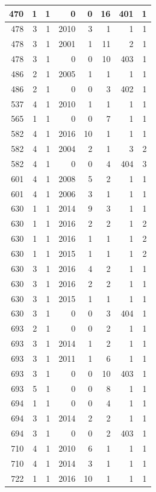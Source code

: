 \documentclass[11pt,]{book}
\begin{document}
\begin{table}
\begin{tabular}[t]{r|r|r|r|r|r|r|r}
470 & 1 & 1 & 0 & 0 & 16 & 401 & 1\\
\hline
478 & 3 & 1 & 2010 & 3 & 1 & 1 & 1\\
\hline
478 & 3 & 1 & 2001 & 1 & 11 & 2 & 1\\
\hline
478 & 3 & 1 & 0 & 0 & 10 & 403 & 1\\
\hline
486 & 2 & 1 & 2005 & 1 & 1 & 1 & 1\\
\hline
486 & 2 & 1 & 0 & 0 & 3 & 402 & 1\\
\hline
537 & 4 & 1 & 2010 & 1 & 1 & 1 & 1\\
\hline
565 & 1 & 1 & 0 & 0 & 7 & 1 & 1\\
\hline
582 & 4 & 1 & 2016 & 10 & 1 & 1 & 1\\
\hline
582 & 4 & 1 & 2004 & 2 & 1 & 3 & 2\\
\hline
582 & 4 & 1 & 0 & 0 & 4 & 404 & 3\\
\hline
601 & 4 & 1 & 2008 & 5 & 2 & 1 & 1\\
\hline
601 & 4 & 1 & 2006 & 3 & 1 & 1 & 1\\
\hline
630 & 1 & 1 & 2014 & 9 & 3 & 1 & 1\\
\hline
630 & 1 & 1 & 2016 & 2 & 2 & 1 & 2\\
\hline
630 & 1 & 1 & 2016 & 1 & 1 & 1 & 2\\
\hline
630 & 1 & 1 & 2015 & 1 & 1 & 1 & 2\\
\hline
630 & 3 & 1 & 2016 & 4 & 2 & 1 & 1\\
\hline
630 & 3 & 1 & 2016 & 2 & 2 & 1 & 1\\
\hline
630 & 3 & 1 & 2015 & 1 & 1 & 1 & 1\\
\hline
630 & 3 & 1 & 0 & 0 & 3 & 404 & 1\\
\hline
693 & 2 & 1 & 0 & 0 & 2 & 1 & 1\\
\hline
693 & 3 & 1 & 2014 & 1 & 2 & 1 & 1\\
\hline
693 & 3 & 1 & 2011 & 1 & 6 & 1 & 1\\
\hline
693 & 3 & 1 & 0 & 0 & 10 & 403 & 1\\
\hline
693 & 5 & 1 & 0 & 0 & 8 & 1 & 1\\
\hline
694 & 1 & 1 & 0 & 0 & 4 & 1 & 1\\
\hline
694 & 3 & 1 & 2014 & 2 & 2 & 1 & 1\\
\hline
694 & 3 & 1 & 0 & 0 & 2 & 403 & 1\\
\hline
710 & 4 & 1 & 2010 & 6 & 1 & 1 & 1\\
\hline
710 & 4 & 1 & 2014 & 3 & 1 & 1 & 1\\
\hline
722 & 1 & 1 & 2016 & 10 & 1 & 1 & 1\\

\end{tabular}
\end{table}
\end{document}
